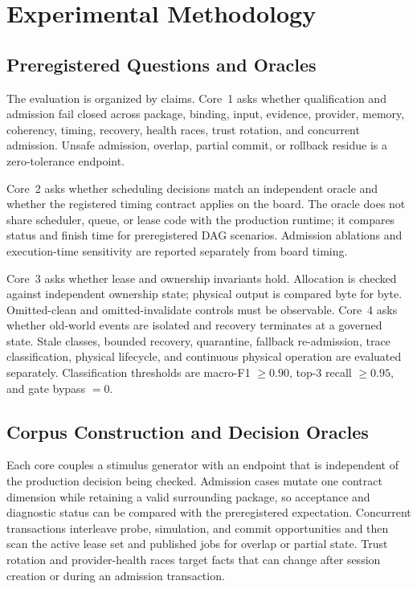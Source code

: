 \documentclass[lettersize,journal]{IEEEtran}
\begin{document}
\section{Experimental Methodology}
\subsection{Preregistered Questions and Oracles}
The evaluation is organized by claims. Core~1 asks whether qualification and
admission fail closed across package, binding, input, evidence, provider,
memory, coherency, timing, recovery, health races, trust rotation, and
concurrent admission. Unsafe admission, overlap, partial commit, or rollback
residue is a zero-tolerance endpoint.

Core~2 asks whether scheduling decisions match an independent oracle and
whether the registered timing contract applies on the board. The oracle does
not share scheduler, queue, or lease code with the production runtime; it
compares status and finish time for preregistered DAG scenarios. Admission
ablations and execution-time sensitivity are reported separately from board
timing.

Core~3 asks whether lease and ownership invariants hold. Allocation is checked
against independent ownership state; physical output is compared byte for byte.
Omitted-clean and omitted-invalidate controls must be observable. Core~4 asks
whether old-world events are isolated and recovery terminates at a governed
state. Stale classes, bounded recovery, quarantine, fallback re-admission,
trace classification, physical lifecycle, and continuous physical operation are
evaluated separately. Classification thresholds are macro-F1 $\ge0.90$,
top-3 recall $\ge0.95$, and gate bypass $=0$.

\subsection{Corpus Construction and Decision Oracles}
Each core couples a stimulus generator with an endpoint that is independent of
the production decision being checked. Admission cases mutate one contract
dimension while retaining a valid surrounding package, so acceptance and
diagnostic status can be compared with the preregistered expectation. Concurrent
transactions interleave probe, simulation, and commit opportunities and then
scan the active lease set and published jobs for overlap or partial state.
Trust rotation and provider-health races target facts that can change after
session creation or during an admission transaction.
\end{document}
